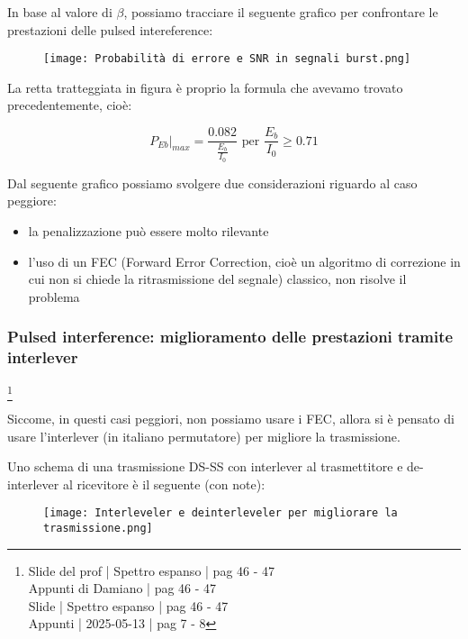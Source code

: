 In base al valore di $\beta$, 
possiamo tracciare il seguente grafico per confrontare le prestazioni delle pulsed intereference: 

\begin{figure}[h]
    \centering
    \texttt{[image: Probabilità di errore e SNR in segnali burst.png]}
\end{figure}

La retta tratteggiata in figura è proprio la formula che avevamo trovato precedentemente, 
cioè: 

{
    \Large 
    \begin{equation}
         \left. P_{Eb} \right|_{max}
         = 
         \frac{0.082}{\frac{E_b}{I_0}} \text{ per } \frac{E_b}{I_0} \ge 0.71 
    \end{equation}
}

Dal seguente grafico possiamo svolgere due considerazioni riguardo al caso peggiore: 

\begin{itemize}
    \item la penalizzazione può essere molto rilevante 
    \item l'uso di un FEC (Forward Error Correction, cioè un algoritmo di correzione in cui non si chiede la ritrasmissione del segnale) classico, non risolve il problema  
\end{itemize}

\newpage 

\subsubsection{Pulsed interference: miglioramento delle prestazioni tramite interlever}
\footnote{Slide del prof | Spettro espanso | pag 46 - 47\\
Appunti di Damiano | pag 46 - 47\\ 
Slide | Spettro espanso | pag 46 - 47 \\
Appunti | 2025-05-13 | pag 7 - 8
} 


Siccome, in questi casi peggiori, non possiamo usare i FEC, 
allora si è pensato di usare l'interlever (in italiano permutatore) per migliore la trasmissione. \newline 

Uno schema di una trasmissione DS-SS con interlever al trasmettitore e de-interlever al ricevitore 
è il seguente (con note): 

\begin{figure}[h]
    \centering
    \texttt{[image: Interleveler e deinterleveler per migliorare la trasmissione.png]}
\end{figure}

